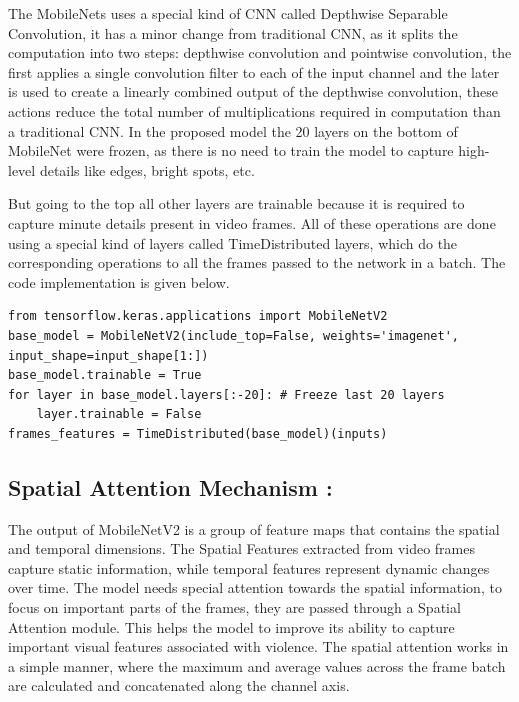 \clearpage

\noindent The MobileNets uses a special kind of CNN called Depthwise Separable Convolution, it has a minor change from traditional CNN, as it splits the computation into two steps: depthwise convolution and pointwise convolution, the first applies a single convolution filter to each of the input channel and the later is used to create a linearly combined output of the depthwise convolution, these actions reduce the total number of multiplications required in computation than a traditional CNN. In the proposed model the 20 layers on the bottom of MobileNet were frozen, as there is no need to train the model to capture high-level details like edges, bright spots, etc.

\noindent But going to the top all other layers are trainable because it is required to capture minute details present in video frames. All of these operations are done using a special kind of layers called TimeDistributed layers, which do the corresponding operations to all the frames passed to the network in a batch. The code implementation is given below.

\begin{lstlisting}
from tensorflow.keras.applications import MobileNetV2
base_model = MobileNetV2(include_top=False, weights='imagenet', input_shape=input_shape[1:])
base_model.trainable = True
for layer in base_model.layers[:-20]: # Freeze last 20 layers
    layer.trainable = False
frames_features = TimeDistributed(base_model)(inputs)
\end{lstlisting}

\vspace{-5mm}

\subsection{Spatial Attention Mechanism :}

\noindent The output of MobileNetV2 is a group of feature maps that contains the spatial and temporal dimensions. The Spatial Features \cite{Spacial_feat} extracted from video frames capture static information, while temporal features \cite{Spacio-tempo} represent dynamic changes over time. The model needs special attention towards the spatial information, to focus on important parts of the frames, they are passed through a Spatial Attention module. This helps the model to improve its ability to capture important visual features associated with violence. The spatial attention works in a simple manner, where the maximum and average values across the frame batch are calculated and concatenated along the channel axis. 

